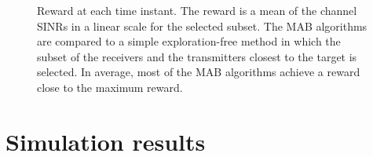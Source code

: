 \documentclass[conference]{IEEEtran}
\begin{document}
\begin{figure}[!tb]
    \hfill
    \caption{Reward at each time instant.
    The reward is a mean of the channel SINRs in a linear scale for the selected subset.
    The MAB algorithms are compared to a simple exploration-free method in which the subset of the receivers and the transmitters closest to the target is selected.
    In average, most of the MAB algorithms achieve a reward close to the maximum reward.}
    \label{fig:sinr}
\end{figure}


\section{Simulation results}
\end{document}
